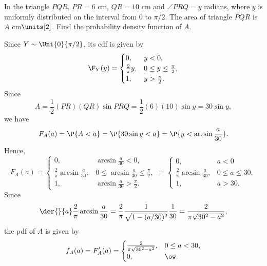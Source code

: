 \begin{problem}
    In the triangle $PQR$, $PR = 6$ cm, $QR = 10$ cm and $\angle PRQ = y$ radians, where $y$ is uniformly distributed on the interval from 0 to $\pi/2$. The area of triangle $PQR$ is $A$ cm$\units[2]$. Find the probability density function of $A$.
\end{problem}
\begin{solution}
    Since $Y \sim \Uni{0}{\pi/2}$, its cdf is given by \[\F_Y(y) = \begin{cases}
        0, & y < 0,\\
        \frac2\pi y, & 0 \leq y \leq \frac\pi2,\\
        1, & y > \frac\pi2.
    \end{cases}\]
    Since \[A = \frac12 (PR)(QR)\sin PRQ = \frac12 (6)(10) \sin y = 30 \sin y,\] we have \[F_A(a) = \P{A < a} = \P{30\sin y < a} = \P{y < \arcsin \frac{a}{30}}.\] Hence, \[F_A(a) = \begin{cases}
        0, & \arcsin \frac{a}{30} < 0,\\
        \frac2\pi \arcsin \frac{a}{30}, & 0 \leq \arcsin \frac{a}{30} \leq \frac\pi2,\\
        1, & \arcsin \frac{a}{30} > \frac\pi2.
    \end{cases} = \begin{cases}
        0, & a < 0\\
        \frac2\pi \arcsin \frac{a}{30}, & 0 \leq a \leq 30,\\
        1, & a > 30.
    \end{cases}\]
    Since \[\der{}{a} \frac2\pi \arcsin \frac{a}{30} = \frac2\pi \frac{1}{\sqrt{1 - (a/30)^2}} \frac1{30} = \frac2{\pi \sqrt{30^2 - a^2}},\] the pdf of $A$ is given by \[f_A(a) = F'_A(a) = \begin{cases}
        \frac2{\pi \sqrt{30^2 - a^2}}, & 0 \leq a < 30,\\
        0, & \ow.
    \end{cases}\]
\end{solution}